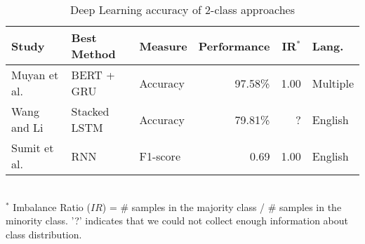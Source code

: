 \begin{table}[ht]
    \caption{Deep Learning accuracy of 2-class approaches }
    \label{tab:DL_performance_2class}
    \centering
    \begin{tabular}{m{} l l r r l}
        \toprule
        \textbf{Study} & \textbf{Best Method} & \textbf{Measure} & \textbf{Performance} & \textbf{IR$^*$} & \textbf{Lang.} \\ 
        \midrule
        Muyan et al.~\cite{Li2022_lr2019} & BERT + GRU & Accuracy & 97.58\% & 1.00 & Multiple \\
        Wang and Li~\cite{Wang2020_lr26} &  Stacked LSTM & Accuracy & 79.81\% & ? & English \\
        Sumit et al.~\cite{Asthana2021_lr76} & RNN & F1-score & 0.69 & 1.00 & English \\
        \bottomrule
    \end{tabular}
    \\ \vspace{0.1cm}
    \footnotesize
    $^*$ Imbalance Ratio ($IR$) = \# samples in the majority class / \# samples in the minority class. '?' indicates that we could not collect enough information about class distribution.
\end{table}